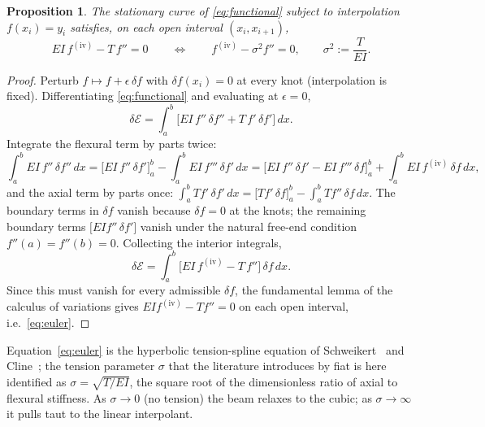 \documentclass[]{interact}
\theoremstyle{plain}
\newtheorem{proposition}{Proposition}
\begin{document}
\begin{proposition}\label{prop:euler}
The stationary curve of \eqref{eq:functional} subject to interpolation
$f(x_i)=y_i$ satisfies, on each open interval $(x_i,x_{i+1})$,
\begin{equation}
EI\,f^{(\mathrm{iv})}-T\,f''=0
\qquad\Longleftrightarrow\qquad
f^{(\mathrm{iv})}-\sigma^2 f''=0,\qquad \sigma^2:=\frac{T}{EI}.
\label{eq:euler}
\end{equation}
\end{proposition}
\begin{proof}
Perturb $f\mapsto f+\epsilon\,\delta f$ with $\delta f(x_i)=0$ at every knot (interpolation is
fixed). Differentiating \eqref{eq:functional} and evaluating at $\epsilon=0$,
\[
\delta\mathcal{E}=\int_a^b\!\big[EI\,f''\,\delta f''+T\,f'\,\delta f'\big]\,dx .
\]
Integrate the flexural term by parts twice:
\[
\int_a^b EI\,f''\,\delta f''\,dx
=\big[EI\,f''\,\delta f'\big]_a^b-\int_a^b EI\,f'''\,\delta f'\,dx
=\big[EI\,f''\,\delta f'-EI\,f'''\,\delta f\big]_a^b+\int_a^b EI\,f^{(\mathrm{iv})}\,\delta f\,dx,
\]
and the axial term by parts once:
$\int_a^b T f'\,\delta f'\,dx=\big[T f'\,\delta f\big]_a^b-\int_a^b T f''\,\delta f\,dx$.
The boundary terms in $\delta f$ vanish because $\delta f=0$ at the knots; the remaining
boundary terms $\big[EI f''\,\delta f'\big]$ vanish under the natural free-end condition
$f''(a)=f''(b)=0$. Collecting the interior integrals,
\[
\delta\mathcal{E}=\int_a^b\!\big[EI\,f^{(\mathrm{iv})}-T\,f''\big]\,\delta f\,dx .
\]
Since this must vanish for every admissible $\delta f$, the fundamental lemma of the calculus of
variations gives $EI f^{(\mathrm{iv})}-T f''=0$ on each open interval, i.e.\ \eqref{eq:euler}.
\end{proof}

Equation~\eqref{eq:euler} is the hyperbolic tension-spline equation of Schweikert~\cite{Schweikert}
and Cline~\cite{Cline}; the tension parameter $\sigma$ that the literature introduces by fiat is
here identified as $\sigma=\sqrt{T/EI}$, the square root of the dimensionless ratio of axial to
flexural stiffness. As $\sigma\to0$ (no tension) the beam relaxes to the cubic; as
$\sigma\to\infty$ it pulls taut to the linear interpolant.
\end{document}
